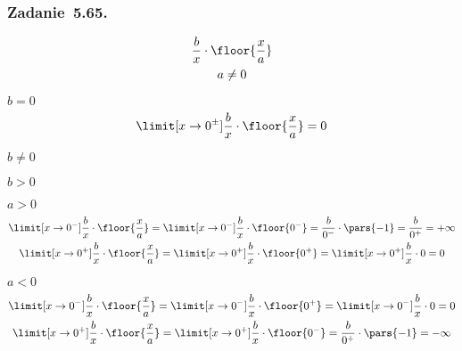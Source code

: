 \subsubsection*{Zadanie~5.65.}
\begin{gather*}
    \frac{b}{x} \cdot \floor{\frac{x}{a}}\\
    a \neq 0
\end{gather*}
\begin{proofcases}
    \item \(b = 0\)
        \begin{equation*}
            \limit[x \to 0^\pm] \frac{b}{x} \cdot \floor{\frac{x}{a}} = 0
        \end{equation*}
    \item \(b \neq 0\)
        \begin{proofcases}
            \item \(b > 0\)
                \begin{proofcases}
                    \item \(a > 0\)
                        \begin{gather*}
                            \limit[x \to 0^-] \frac{b}{x} \cdot \floor{\frac{x}{a}}
                                = \limit[x \to 0^-] \frac{b}{x} \cdot \floor{0^-}
                                = \frac{b}{0^-} \cdot \pars{-1}
                                = \frac{b}{0^+}
                                = +\infty\\
                            \limit[x \to 0^+] \frac{b}{x} \cdot \floor{\frac{x}{a}}
                                = \limit[x \to 0^+] \frac{b}{x} \cdot \floor{0^+}
                                = \limit[x \to 0^+] \frac{b}{x} \cdot 0
                                = 0
                        \end{gather*}
                    \item \(a < 0\)
                        \begin{gather*}
                            \limit[x \to 0^-] \frac{b}{x} \cdot \floor{\frac{x}{a}}
                                = \limit[x \to 0^-] \frac{b}{x} \cdot \floor{0^+}
                                = \limit[x \to 0^-] \frac{b}{x} \cdot 0
                                = 0\\
                            \limit[x \to 0^+] \frac{b}{x} \cdot \floor{\frac{x}{a}}
                                = \limit[x \to 0^+] \frac{b}{x} \cdot \floor{0^-}
                                = \frac{b}{0^+} \cdot \pars{-1}
                                = -\infty

\end{gather*}
\end{proofcases}
\end{proofcases}
\end{proofcases}
